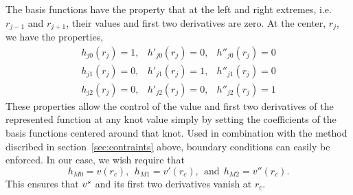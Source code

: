 \documentclass{article}
\begin{document}
The basis functions have the property that at the left and right
extremes, i.e. $r_{j-1}$ and $r_{j+1}$, their values and first two
derivatives are zero.  At the center, $r_j$, we have the properties,
\begin{eqnarray}
h_{j0}(r_j)=1, & h'_{j0}(r_j)=0, & h''_{j0}(r_j)= 0 \\
h_{j1}(r_j)=0, & h'_{j1}(r_j)=1, & h''_{j1}(r_j)= 0 \\
h_{j2}(r_j)=0, & h'_{j2}(r_j)=0, & h''_{j2}(r_j)= 1 
\end{eqnarray}
These properties allow the control of the value and first two derivatives
of the represented function at any knot value simply by setting the
coefficients of the basis functions centered around that knot.  Used
in combination with the method discribed in
section~\ref{sec:contraints} above, boundary conditions can easily be
enforced.  In our case, we wish require that
\begin{equation}
h_{M0} = v(r_c), \ \ h_{M1} = v'(r_c), \ \ \text{and} \ \  h_{M2} = v''(r_c).
\end{equation}
This ensures that $v^s$ and its first two derivatives vanish at $r_c$.
\end{document}
